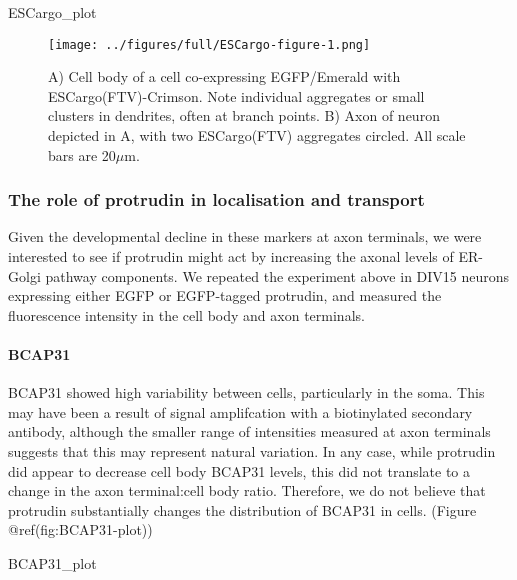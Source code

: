 \documentclass[
  12pt,
  a4paper,
]{article}
\newenvironment{Shaded}{\begin{snugshade}}{\end{snugshade}}
\newcommand{\NormalTok}[1]{#1}
\begin{document}
\begin{Shaded}
\begin{Highlighting}[]
\NormalTok{ESCargo\_plot}
\end{Highlighting}
\end{Shaded}

\begin{figure}
\centering
\texttt{[image: ../figures/full/ESCargo-figure-1.png]}
\caption{A) Cell body of a cell co-expressing EGFP/Emerald with
ESCargo(FTV)-Crimson. Note individual aggregates or small clusters in
dendrites, often at branch points. B) Axon of neuron depicted in A, with
two ESCargo(FTV) aggregates circled. All scale bars are 20\(\mu\)m.}
\end{figure}

\hypertarget{the-role-of-protrudin-in-localisation-and-transport}{%
\subsubsection{The role of protrudin in localisation and
transport}\label{the-role-of-protrudin-in-localisation-and-transport}}

Given the developmental decline in these markers at axon terminals, we
were interested to see if protrudin might act by increasing the axonal
levels of ER-Golgi pathway components. We repeated the experiment above
in DIV15 neurons expressing either EGFP or EGFP-tagged protrudin, and
measured the fluorescence intensity in the cell body and axon terminals.

\hypertarget{bcap31}{%
\paragraph{BCAP31}\label{bcap31}}

BCAP31 showed high variability between cells, particularly in the soma.
This may have been a result of signal amplifcation with a biotinylated
secondary antibody, although the smaller range of intensities measured
at axon terminals suggests that this may represent natural variation. In
any case, while protrudin did appear to decrease cell body BCAP31
levels, this did not translate to a change in the axon terminal:cell
body ratio. Therefore, we do not believe that protrudin substantially
changes the distribution of BCAP31 in cells. (Figure
@ref(fig:BCAP31-plot))

\begin{Shaded}
\begin{Highlighting}[]
\NormalTok{BCAP31\_plot}
\end{Highlighting}
\end{Shaded}
\end{document}
